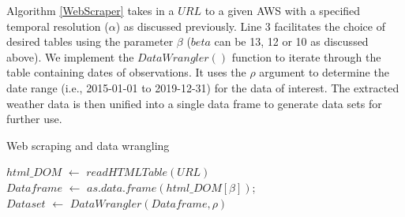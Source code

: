 \documentclass[a4paper, 10pt, conference]{ieeeconf}      %
\begin{document}
\newpage
\noindent
Algorithm \ref{WebScraper} takes in a  $URL$ to a given AWS with a specified temporal resolution ($\alpha$) as discussed previously.
Line 3 facilitates the choice of  desired tables  using the parameter $\beta$ ($beta$ can be 13, 12 or 10 as discussed above). 
We implement the $DataWrangler()$ function to iterate through the table containing  dates of  observations. It uses the $\rho$ argument to determine the date range (i.e., 2015-01-01 to 2019-12-31) for the data of interest. The extracted weather data is then unified into a single data frame to generate   data sets for further use. %

	\begin{algorithm}
		\caption{Web scraping and data wrangling}
		\label{WebScraper}
		{%
			$html\_DOM$ $\leftarrow$ $readHTMLTable(URL)$\\
			$Dataframe$ $\leftarrow$ $as.data.frame(html\_DOM[\beta])$; \\
			$Dataset$ $\leftarrow$ $DataWrangler(Dataframe,\rho)$\\
			
		}
	\end{algorithm}
	\noindent
\end{document}
